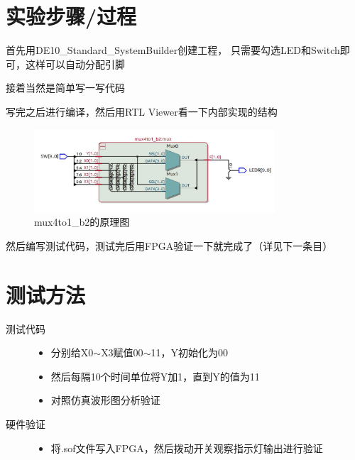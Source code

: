 \documentclass[12pt,a4paper,UTF8]{article}
\begin{document}
\section{实验步骤/过程}
 {
  \begin{list}{(\thestepcnt)}{} %
    \item 首先用DE10\_Standard\_SystemBuilder创建工程，
          只需要勾选LED和Switch即可，这样可以自动分配引脚
    \item 接着当然是简单写一写代码
    \item 写完之后进行编译，然后用RTL Viewer看一下内部实现的结构
          \begin{figure}[H]
            \centering
            \includegraphics[width=0.8\textwidth]{mux_RTL.JPG}
            \caption{mux4to1\_b2的原理图}
            \label{mux_RTL}
          \end{figure}

    \item 然后编写测试代码，测试完后用FPGA验证一下就完成了（详见下一条目）
  \end{list}
 }

\section{测试方法}
\begin{description}
  \item[\hspace{2em}测试代码] \hspace*{\fill}
        \begin{itemize}
          \item 分别给X0$\sim$X3赋值00$\sim$11，Y初始化为00
          \item 然后每隔10个时间单位将Y加1，直到Y的值为11
          \item 对照仿真波形图分析验证
        \end{itemize}
  \item [\hspace{2em}硬件验证] \hspace*{\fill}
        \begin{itemize}
          \item 将.sof文件写入FPGA，然后拨动开关观察指示灯输出进行验证
        \end{itemize}
\end{description}
\end{document}
